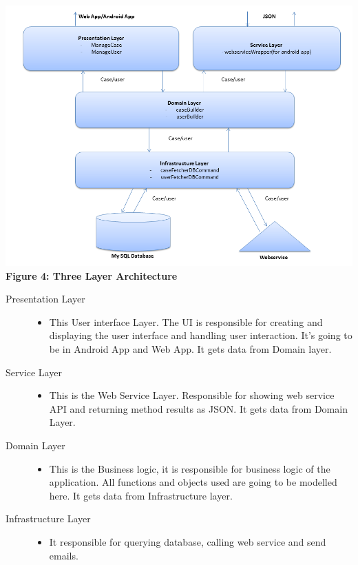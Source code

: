\documentclass[10pt,a4paper]{article}
\begin{document}
\begin{center}
\includegraphics[scale=0.4]{Framework.png}
\textbf{Figure 4: Three Layer Architecture}
\end{center}


\begin{description}
\item [Presentation Layer]

\begin{itemize}
\item This User interface Layer. The UI is responsible for creating and displaying the user interface and handling user interaction. It’s going to be in Android App and Web App. It gets data from Domain layer.
\end{itemize}

\item [Service Layer]

\begin{itemize}
\item This is the Web Service Layer. Responsible for showing web service API and returning method results as JSON. It gets data from Domain Layer.
\end{itemize}

\item [Domain Layer]

\begin{itemize}
\item This is the Business logic, it is responsible for business logic of the application. All functions and objects used are going to be modelled here. It gets data from Infrastructure layer.
\end{itemize}

\item [Infrastructure Layer]

\begin{itemize}
\item It responsible for querying database, calling web service and send emails.
\end{itemize}
\end{description}
\end{document}
